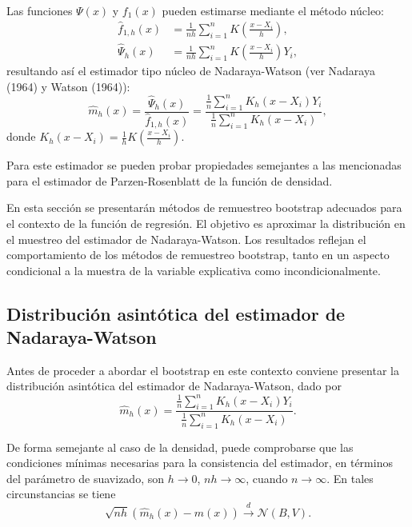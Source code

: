 \documentclass[
]{book}
\theoremstyle{break}
\theoremstyle{definition}
\theoremstyle{definition}
\theoremstyle{definition}
\theoremstyle{remark}
\begin{document}
Las funciones \(\Psi \left( x \right)\) y \(f_1\left( x \right)\) pueden
estimarse mediante el método núcleo:
\[\begin{aligned}
\hat{f}_{1,h}\left( x \right) &= \frac{1}{nh}\sum_{i=1}^{n}K\left( \frac{
x-X_i}{h} \right), \\
\hat{\Psi}_{h}\left( x \right) &= \frac{1}{nh}\sum_{i=1}^{n}K\left( \frac{
x-X_i}{h} \right) Y_i,
\end{aligned}\]
resultando así el estimador tipo núcleo de Nadaraya-Watson
(ver Nadaraya (1964) y Watson (1964)):
\[\hat{m}_{h}\left( x \right) =\frac{\hat{\Psi}_{h}\left( x \right)}{\hat{f}
_{1,h}\left( x \right)}=\frac{\frac{1}{n}\sum_{i=1}^{n}K_{h}\left(
x-X_i \right) Y_i}{\frac{1}{n}\sum_{i=1}^{n}K_{h}\left( x-X_i \right)},\]
donde \(K_{h}\left( x-X_i \right) =\frac{1}{h}K\left( \frac{x-X_i}{h} \right)\).

Para este estimador se pueden probar propiedades semejantes a las
mencionadas para el estimador de Parzen-Rosenblatt de la función de
densidad.

En esta sección se presentarán métodos de remuestreo bootstrap adecuados
para el contexto de la función de regresión. El objetivo es aproximar la
distribución en el muestreo del estimador de Nadaraya-Watson. Los
resultados reflejan el comportamiento de los métodos de remuestreo
bootstrap, tanto en un aspecto condicional a la muestra de la variable
explicativa como incondicionalmente.

\hypertarget{distribuciuxf3n-asintuxf3tica-del-estimador-de-nadaraya-watson}{%
\subsection{Distribución asintótica del estimador de Nadaraya-Watson}\label{distribuciuxf3n-asintuxf3tica-del-estimador-de-nadaraya-watson}}

Antes de proceder a abordar el bootstrap en este contexto conviene
presentar la distribución asintótica del estimador de Nadaraya-Watson,
dado por
\[\hat{m}_{h}\left( x \right) =\frac{\frac{1}{n}\sum_{i=1}^{n}K_{h}\left(
x-X_i \right) Y_i}{\frac{1}{n}\sum_{i=1}^{n}K_{h}\left( x-X_i \right)}.\]

De forma semejante al caso de la densidad, puede comprobarse que las
condiciones mínimas necesarias para la consistencia del estimador, en
términos del parámetro de suavizado, son \(h\rightarrow 0\),
\(nh\rightarrow \infty\), cuando \(n\rightarrow \infty\). En tales
circunstancias se tiene
\[\sqrt{nh}\left( \hat{m}_{h}\left( x \right) -m\left( x \right) \right) \overset
{d}{\rightarrow }\mathcal{N}\left( B,V \right) \text{.}\]
\end{document}
